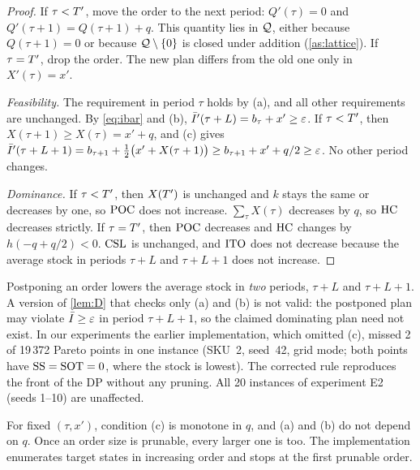 \begin{proof}
  If $\tau<T'$, move the order to the next period:
  $Q'(\tau)=0$ and $Q'(\tau+1)=Q(\tau+1)+q$. This quantity lies in $\mathcal{Q}$, either because
  $Q(\tau+1)=0$ or because $\mathcal{Q}\setminus\{0\}$ is closed under addition
  (\cref{as:lattice}). If $\tau=T'$, drop the order. The new plan differs from the old
  one only in $X'(\tau)=x'$.

  \emph{Feasibility.} The requirement in period $\tau$ holds by (a), and all other
  requirements are unchanged. By \eqref{eq:ibar} and (b),
  $\bar I'(\tau+L)=b_\tau+x'\ge\varepsilon$. If $\tau<T'$, then $X(\tau+1)\ge X(\tau)=x'+q$, and (c)
  gives $\bar I'(\tau+L+1)=b_{\tau+1}+\tfrac12\bigl(x'+X(\tau+1)\bigr)\ge b_{\tau+1}+x'+q/2\ge\varepsilon$.
  No other period changes.

  \emph{Dominance.} If $\tau<T'$, then $X(T')$ is unchanged and $k$ stays the same or
  decreases by one, so $\mathrm{POC}$ does not increase. $\sum_\tau X(\tau)$ decreases by $q$, so
  $\mathrm{HC}$ decreases strictly. If $\tau=T'$, then $\mathrm{POC}$ decreases and $\mathrm{HC}$ changes by
  $h(-q+q/2)<0$. $\mathrm{CSL}$ is unchanged, and $\mathrm{ITO}$ does not decrease because the average
  stock in periods $\tau+L$ and $\tau+L+1$ does not increase.
\end{proof}

\begin{remark}\label{rem:c}
  Postponing an order lowers the average stock in \emph{two} periods, $\tau+L$ and
  $\tau+L+1$. A version of \cref{lem:D} that checks only (a) and (b) is not valid: the
  postponed plan may violate $\bar I\ge\varepsilon$ in period $\tau+L+1$, so the claimed dominating
  plan need not exist. In our experiments the earlier implementation, which omitted (c),
  missed 2 of 19\,372 Pareto points in one instance (SKU~2, seed~42, grid mode; both
  points have $\mathrm{SS}=\mathrm{SOT}=0$, where the stock is lowest). The corrected rule reproduces the
  front of the DP without any pruning. All 20 instances of experiment E2 (seeds 1--10) are
  unaffected.
\end{remark}

\begin{remark}[Implementation]
  For fixed $(\tau,x')$, condition (c) is monotone in $q$, and (a) and (b) do not depend
  on $q$. Once an order size is prunable, every larger one is too. The implementation
  enumerates target states in increasing order and stops at the first prunable order.
\end{remark}

